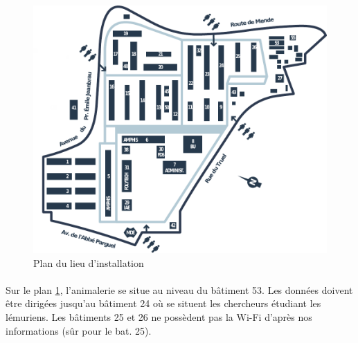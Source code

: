     \begin{figure}[h]
        \centering
        \includegraphics[trim={9.4cm 9cm 0cm 0cm},clip,scale=1.6]{images/plan.pdf}
        \caption{Plan du lieu d'installation}
        \label{fig:plan}
    \end{figure}

    \paragraph{}Sur le plan \ref{fig:plan}, l'animalerie se situe au niveau du bâtiment 53. Les données doivent être dirigées jusqu'au bâtiment 24 où se situent les chercheurs étudiant les lémuriens. Les bâtiments 25 et 26 ne possèdent pas la Wi-Fi d'après nos informations (sûr pour le bat. 25).
